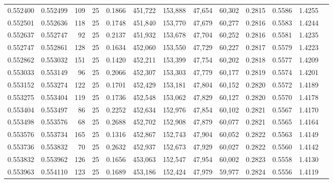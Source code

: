 \begin{tabular}{rrrrrrrrrrrrr}
0.552400 & 0.552499 &   109 &  25 &                                     0.1866 & 451,722 & 153,888 &  47,654 &  60,302 & 0.2815 & 0.5586 & 1.4255 \\
0.552501 & 0.552636 &   118 &  25 &                                     0.1748 & 451,840 & 153,770 &  47,679 &  60,277 & 0.2816 & 0.5583 & 1.4244 \\
0.552637 & 0.552747 &    92 &  25 &                                     0.2137 & 451,932 & 153,678 &  47,704 &  60,252 & 0.2816 & 0.5581 & 1.4235 \\
0.552747 & 0.552861 &   128 &  25 &                                     0.1634 & 452,060 & 153,550 &  47,729 &  60,227 & 0.2817 & 0.5579 & 1.4223 \\
0.552862 & 0.553032 &   151 &  25 &                                     0.1420 & 452,211 & 153,399 &  47,754 &  60,202 & 0.2818 & 0.5577 & 1.4209 \\
0.553033 & 0.553149 &    96 &  25 &                                     0.2066 & 452,307 & 153,303 &  47,779 &  60,177 & 0.2819 & 0.5574 & 1.4201 \\
0.553152 & 0.553274 &   122 &  25 &                                     0.1701 & 452,429 & 153,181 &  47,804 &  60,152 & 0.2820 & 0.5572 & 1.4189 \\
0.553275 & 0.553404 &   119 &  25 &                                     0.1736 & 452,548 & 153,062 &  47,829 &  60,127 & 0.2820 & 0.5570 & 1.4178 \\
0.553404 & 0.553497 &    86 &  25 &                                     0.2252 & 452,634 & 152,976 &  47,854 &  60,102 & 0.2821 & 0.5567 & 1.4170 \\
0.553498 & 0.553576 &    68 &  25 &                                     0.2688 & 452,702 & 152,908 &  47,879 &  60,077 & 0.2821 & 0.5565 & 1.4164 \\
0.553576 & 0.553734 &   165 &  25 &                                     0.1316 & 452,867 & 152,743 &  47,904 &  60,052 & 0.2822 & 0.5563 & 1.4149 \\
0.553736 & 0.553832 &    70 &  25 &                                     0.2632 & 452,937 & 152,673 &  47,929 &  60,027 & 0.2822 & 0.5560 & 1.4142 \\
0.553832 & 0.553962 &   126 &  25 &                                     0.1656 & 453,063 & 152,547 &  47,954 &  60,002 & 0.2823 & 0.5558 & 1.4130 \\
0.553963 & 0.554110 &   123 &  25 &                                     0.1689 & 453,186 & 152,424 &  47,979 &  59,977 & 0.2824 & 0.5556 & 1.4119 \\

\end{tabular}
